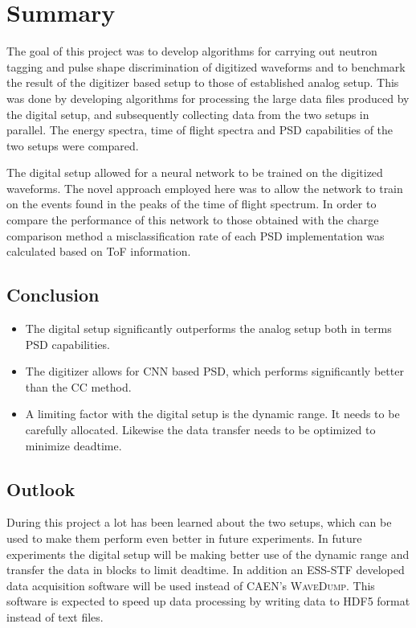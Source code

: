 \documentclass[main.tex]{subfiles}
\begin{document}
\chapter{Summary}
The goal of this project was to develop algorithms for carrying out neutron tagging and pulse shape discrimination of digitized waveforms and to benchmark the result of the digitizer based setup to those of established analog setup. This was done by developing algorithms for processing the large data files produced by the digital setup, and subsequently collecting data from the two setups in parallel. The energy spectra, time of flight spectra and PSD capabilities of the two setups were compared.

The digital setup allowed for a neural network to be trained on the digitized waveforms. The novel approach employed here was to allow the network to train on the events found in the peaks of the time of flight spectrum. In order to compare the performance of this network to those obtained with the charge comparison method a misclassification rate of each PSD implementation was calculated based on ToF information.



\section{Conclusion}

\begin{itemize}
	\item The digital setup significantly outperforms the analog setup both in terms PSD capabilities.
	\item The digitizer allows for CNN based PSD, which performs significantly better than the CC method.
	\item A limiting factor with the digital setup is the dynamic range. It needs to be carefully allocated. Likewise the data transfer needs to be optimized to minimize deadtime.
\end{itemize}

\section{Outlook}
During this project a lot has been learned about the two setups, which can be used to make them perform even better in future experiments. In future experiments the digital setup will be making better use of the dynamic range and transfer the data in blocks to limit deadtime. In addition an ESS-STF developed data acquisition software will be used instead of CAEN's \textsc{WaveDump}. This software is expected to speed up data processing by writing data to HDF5 format instead of text files.
\end{document}
